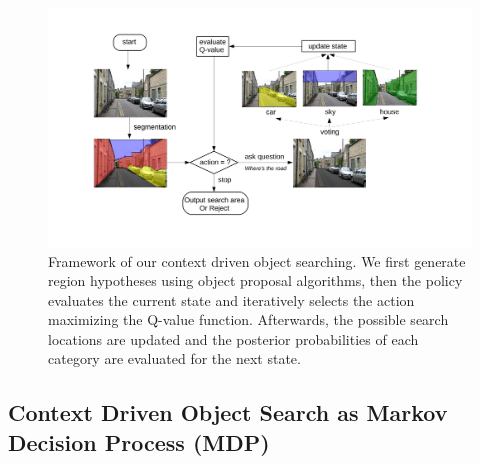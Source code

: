 \begin{figure}[htb]
\begin{center}
\includegraphics[width=\linewidth]{figures/flowchart_Q.pdf}
\caption{Framework of our context driven object searching. We first generate region hypotheses using object proposal algorithms, then the policy evaluates the current state and iteratively selects the action maximizing the Q-value function. Afterwards, the possible search locations are updated and the posterior probabilities of each category are evaluated for the next state.}
\label{fig:flowchart}
\end{center}

\end{figure}

\subsection{Context Driven Object Search as Markov Decision Process (MDP)}
\label{sec:policy}

